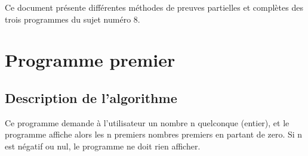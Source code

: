 \documentclass{scrreprt}
\begin{document}
Ce document présente différentes méthodes de preuves partielles et complètes des trois programmes du sujet numéro 8.

%
%
%

\chapter{Programme premier}

\section{Description de l'algorithme}
Ce programme demande à l'utilisateur un nombre n quelconque (entier), et le programme affiche alors les n premiers nombres premiers en partant de zero. Si n est négatif ou nul, le programme ne doit rien afficher.
\end{document}
